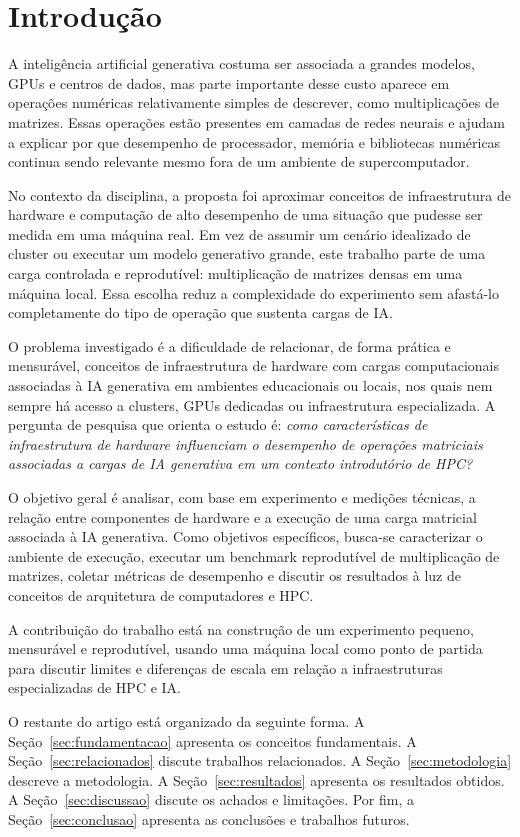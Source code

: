 \section{Introdução}

A inteligência artificial generativa costuma ser associada a grandes modelos, GPUs e centros de dados, mas parte importante desse custo aparece em operações numéricas relativamente simples de descrever, como multiplicações de matrizes. Essas operações estão presentes em camadas de redes neurais e ajudam a explicar por que desempenho de processador, memória e bibliotecas numéricas continua sendo relevante mesmo fora de um ambiente de supercomputador.

No contexto da disciplina, a proposta foi aproximar conceitos de infraestrutura de hardware e computação de alto desempenho de uma situação que pudesse ser medida em uma máquina real. Em vez de assumir um cenário idealizado de cluster ou executar um modelo generativo grande, este trabalho parte de uma carga controlada e reprodutível: multiplicação de matrizes densas em uma máquina local. Essa escolha reduz a complexidade do experimento sem afastá-lo completamente do tipo de operação que sustenta cargas de IA.

O problema investigado é a dificuldade de relacionar, de forma prática e mensurável, conceitos de infraestrutura de hardware com cargas computacionais associadas à IA generativa em ambientes educacionais ou locais, nos quais nem sempre há acesso a clusters, GPUs dedicadas ou infraestrutura especializada. A pergunta de pesquisa que orienta o estudo é: \textit{como características de infraestrutura de hardware influenciam o desempenho de operações matriciais associadas a cargas de IA generativa em um contexto introdutório de HPC?}

O objetivo geral é analisar, com base em experimento e medições técnicas, a relação entre componentes de hardware e a execução de uma carga matricial associada à IA generativa. Como objetivos específicos, busca-se caracterizar o ambiente de execução, executar um benchmark reprodutível de multiplicação de matrizes, coletar métricas de desempenho e discutir os resultados à luz de conceitos de arquitetura de computadores e HPC.

A contribuição do trabalho está na construção de um experimento pequeno, mensurável e reprodutível, usando uma máquina local como ponto de partida para discutir limites e diferenças de escala em relação a infraestruturas especializadas de HPC e IA.

O restante do artigo está organizado da seguinte forma. A Seção~\ref{sec:fundamentacao} apresenta os conceitos fundamentais. A Seção~\ref{sec:relacionados} discute trabalhos relacionados. A Seção~\ref{sec:metodologia} descreve a metodologia. A Seção~\ref{sec:resultados} apresenta os resultados obtidos. A Seção~\ref{sec:discussao} discute os achados e limitações. Por fim, a Seção~\ref{sec:conclusao} apresenta as conclusões e trabalhos futuros.
